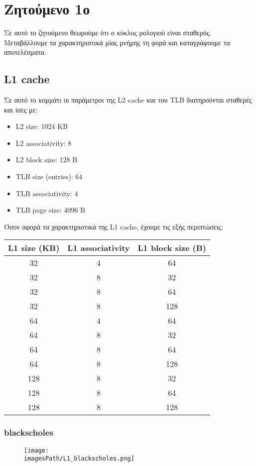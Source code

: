 \documentclass[12pt,a4paper]{article}
\newcommand{\imagesPath}{parsec-3.0/parsec_workspace/graphs}
\begin{document}
	\section{Ζητούμενο 1ο}
		Σε αυτό το ζητούμενο θεωρούμε ότι ο κύκλος ρολογιού είναι σταθερός. Μεταβάλλουμε τα χαρακτηριστικά μίας μνήμης τη φορά και καταγράφουμε τα αποτελέσματα.
		
		\subsection{L1 cache}
			Σε αυτό το κομμάτι οι παράμετροι της L2 cache και του TLB διατηρούνται σταθερές και ίσες με:
			
			\begin{itemize}
				\item L2 size: 1024 KB
				\item L2 associativity: 8
				\item L2 block size: 128 B
				\item TLB size (entries): 64
				\item TLB associativity: 4
				\item TLB page size: 4096 B
			\end{itemize}
		
			Όσον αφορά τα χαρακτηριστικά της L1 cache, έχουμε τις εξής περιπτώσεις:
			
			\begin{center}
			\begin{tabular}{|c|c|c|}
				\hline
				L1 size (KB) & L1 associativity & L1 block size (B) \\
				\hline
				32 & 4 & 64 \\
				\hline
				32 & 8 & 32 \\
				\hline
 				32 & 8 & 64 \\
				\hline
				32 & 8 & 128 \\
				\hline
				64 & 4 & 64 \\
				\hline
				64 & 8 & 32 \\
				\hline
				64 & 8 & 64 \\
				\hline
				64 & 8 & 128 \\
				\hline
				128 & 8 & 32 \\
				\hline
				128 & 8 & 64 \\
				\hline
				128 & 8 & 128 \\
				\hline
			\end{tabular}
		\end{center}
		
			\subsubsection{blackscholes}
				\begin{figure}[H]
					\begin{center}
						\texttt{[image: \\imagesPath/L1\_blackscholes.png]}
					\end{center}
				\end{figure}
							
\end{document}
